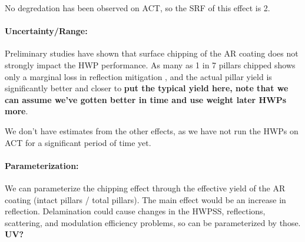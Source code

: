 No degredation has been observed on ACT, so the SRF of this effect is 2.


\paragraph{Uncertainty/Range:}


Preliminary studies have shown that surface chipping of the AR coating does not strongly impact the HWP performance. As many as 1 in 7 pillars chipped shows only a marginal loss in reflection mitigation \cite{SiAR_1}, and the actual pillar yield is significantly better and closer to \textbf{put the typical yield here, note that we can assume we've gotten better in time and use weight later HWPs more}.


We don't have estimates from the other effects, as we have not run the HWPs on ACT for a significant period of time yet.

\paragraph{Parameterization:}
We can parameterize the chipping effect through the effective yield of the AR coating (intact pillars / total pillars). The main effect would be an increase in reflection. Delamination could cause changes in the HWPSS, reflections, scattering, and modulation efficiency problems, so can be parameterized by those. \textbf{UV?}
